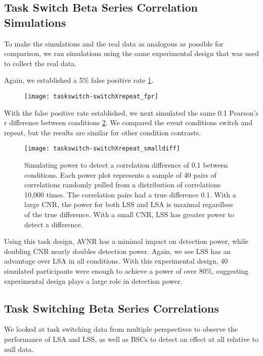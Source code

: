 \documentclass[10pt,letterpaper]{article}
\begin{document}
\subsection*{Task Switch Beta Series Correlation Simulations}
\label{results:bsc-taskswitch-simulations}

To make the simulations and the real data as analogous as possible
for comparison, we ran simulations using the same experimental design
that was used to collect the real data.

Again, we established a 5\% false positive rate \ref{fig:task_fpr}.

\begin{figure}[H]
  \centering
    \texttt{[image: taskswitch-switchXrepeat\_fpr]}
  \label{fig:task_fpr}
\end{figure}

With the false positive rate established, we next simulated the same 0.1 Pearson's r difference
between conditions \ref{fig:task_smalldiff}.
We compared the event conditions switch and repeat, but the results are similar for other
condition contrasts.

\begin{figure}[H]
  \centering
  \texttt{[image: taskswitch-switchXrepeat\_smalldiff]}
  \caption{
    Simulating power to detect a correlation difference of 0.1 between
    conditions.
    Each power plot represents a sample of 40 pairs of correlations
    randomly pulled from a distribution of correlations 10,000 times.
    The correlation pairs had a true difference 0.1.
    With a large CNR, the power for both LSS and LSA
    is maximal regardless of the true difference.
    With a small CNR, LSS has greater power to detect a difference.
  }
  \label{fig:task_smalldiff}
\end{figure}

Using this task design, AVNR has a minimal impact on detection power, while
doubling CNR nearly doubles detection power.
Again, we see LSS has an advantage over LSA in all conditions.
With this experimental design, 40 simulated participants were enough to achieve
a power of over 80\%, suggesting experimental design plays a large role in
detection power.

\subsection*{Task Switching Beta Series Correlations}
\label{results:bsc-taskswitch}

We looked at task switching data from multiple perspectives to
observe the performance of LSA and LSS, as well as BSCs
to detect an effect at all relative to null data.
\end{document}
